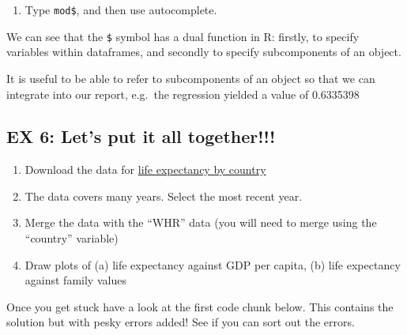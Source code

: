 \documentclass[]{article}
\providecommand{\tightlist}{%
  \setlength{\itemsep}{0pt}\setlength{\parskip}{0pt}}
\begin{document}
\begin{enumerate}
\def\labelenumi{\arabic{enumi}.}
\setcounter{enumi}{1}
\tightlist
\item
  Type \texttt{mod\$}, and then use autocomplete.
\end{enumerate}

We can see that the \texttt{\$} symbol has a dual function in R:
firstly, to specify variables within dataframes, and secondly to specify
subcomponents of an object.

It is useful to be able to refer to subcomponents of an object so that
we can integrate into our report, e.g.~the regression yielded a value of
0.6335398

\hypertarget{ex-6-lets-put-it-all-together}{%
\subsection{EX 6: Let's put it all
together!!!}\label{ex-6-lets-put-it-all-together}}

\begin{enumerate}
\def\labelenumi{(\arabic{enumi})}
\tightlist
\item
  Download the data for \href{WHO_life_expectancy.csv}{life expectancy
  by country}
\item
  The data covers many years. Select the most recent year.
\item
  Merge the data with the ``WHR'' data (you will need to merge using the
  ``country'' variable)
\item
  Draw plots of (a) life expectancy against GDP per capita, (b) life
  expectancy against family values
\end{enumerate}

Once you get stuck have a look at the first code chunk below. This
contains the solution but with pesky errors added! See if you can sort
out the errors.
\end{document}
